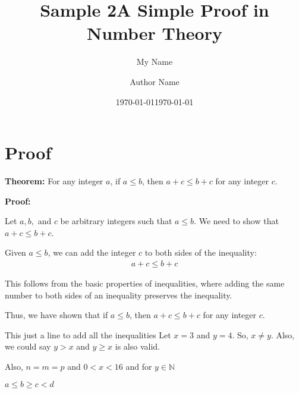 \documentclass{article} %
\title{Sample 2} %
\author{My Name} %
\date{\today} %
\begin{document}
\title{A Simple Proof in Number Theory}
\author{Author Name}
\date{\today}
\maketitle

\section*{Proof}

\textbf{Theorem:} For any integer $a$, if $a \leq b$, then $a + c \leq b + c$ for any integer $c$.

\textbf{Proof:}

Let $a, b,$ and $c$ be arbitrary integers such that $a \leq b$. We need to show that $a + c \leq b + c$.

Given $a \leq b$, we can add the integer $c$ to both sides of the inequality:
\begin{equation}
    \begin{split}
        a + c \leq b + c
    \end{split}
\end{equation}

This follows from the basic properties of inequalities, where adding the same number to both sides of an inequality preserves the inequality.

Thus, we have shown that if $a \leq b$, then $a + c \leq b + c$ for any integer $c$. \n

This just a line to add all the inequalities Let $x = 3$ and $y = 4$. So, $x \neq y$. Also, we could say $y > x$ and $y \geq x$ is also valid.

Also, $n = m = p$ and $0 < x < 16$ and for $ y \in \mathbb{N}$

$a \leq b \geq c < d$
\end{document}
